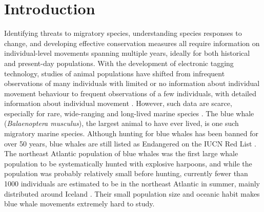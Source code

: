 \documentclass[a4paper,12pt]{article}
\begin{document}
\section{Introduction}
Identifying threats to migratory species, understanding species responses to change, and developing effective conservation measures all require information on individual-level movements spanning multiple years, ideally for both historical and present-day populations.
With the development of electronic tagging technology, studies of animal populations have shifted from infrequent observations of many individuals with limited or no information about individual movement behaviour to frequent observations of a few individuals, with detailed information about individual movement \cite{holdo2013inferring}. 
However, such data are scarce, especially for rare, wide-ranging and long-lived marine species \cite{ryan2013stable,bailey2009behavioural}. 
The blue whale (\textit{Balaenoptera musculus}), the largest animal to have ever lived, is one such migratory marine species. 
Although hunting for blue whales has been banned for over 50 years, blue whales are still listed as Endangered on the IUCN Red List \cite{reilly2008balaenoptera}.
The northeast Atlantic population of blue whales was the first large whale population to be systematically hunted with explosive harpoons, and while the population was probably relatively small before hunting, currently fewer than 1000 individuals are estimated to be in the northeast Atlantic in summer, mainly distributed around Iceland \cite{pike2009note}.
Their small population size and oceanic habit makes blue whale movements extremely hard to study. 
\end{document}
